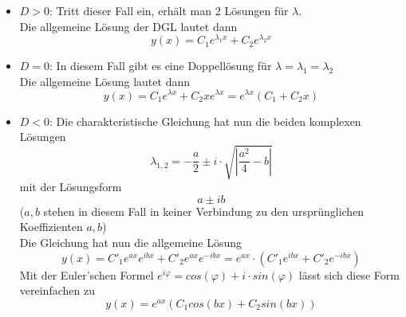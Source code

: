 \begin{itemize}
	
	\item $D > 0$:
		Tritt dieser Fall ein, erhält man 2 Lösungen für $\lambda$.\\
		Die allgemeine Lösung der DGL lautet dann
		\begin{equation}
			y(x) = C_1 e^{\lambda_1 x} + C_2 e^{\lambda_2 x}
		\end{equation} 
	
	\item $D = 0$: 
		In diesem Fall gibt es eine Doppellösung für $\lambda = \lambda_1 = \lambda_2$\\
		Die allgemeine Lösung lautet dann
		\begin{equation}
			y(x) = C_1 e^{\lambda x} + C_2 xe^{\lambda x} = e^{\lambda x}(C_1+C_2 x)
		\end{equation}
	
	\item $D < 0$:
		Die charakteristische Gleichung hat nun die beiden komplexen Lösungen 
		\begin{equation}
			\lambda_{1,2} = -\frac{a}{2} \pm i \cdot \sqrt{\left| \frac{a^2}{4}-b\right|}
		\end{equation}
		mit der Lösungsform
		\begin{equation}
			a \pm ib
		\end{equation}
		($a,b$ stehen in diesem Fall in keiner Verbindung zu den ursprünglichen Koeffizienten $a,b$)\\
		Die Gleichung hat nun die allgemeine Lösung 
		\begin{equation}
			y(x) = C'_1 e^{ax}e^{ibx} + C'_2 e^{ax}e^{-ibx} = e^{ax} \cdot (C'_1 e^{ibx}+C'_2 e^{-ibx})
		\end{equation}
		Mit der Euler'schen Formel $e^{i\varphi} = cos(\varphi)+i \cdot sin(\varphi)$ lässt sich diese Form vereinfachen zu 
		\begin{equation}
			y(x) = e^{ax}(C_1 cos(bx) + C_2 sin(bx))
		\end{equation}
\end{itemize}

